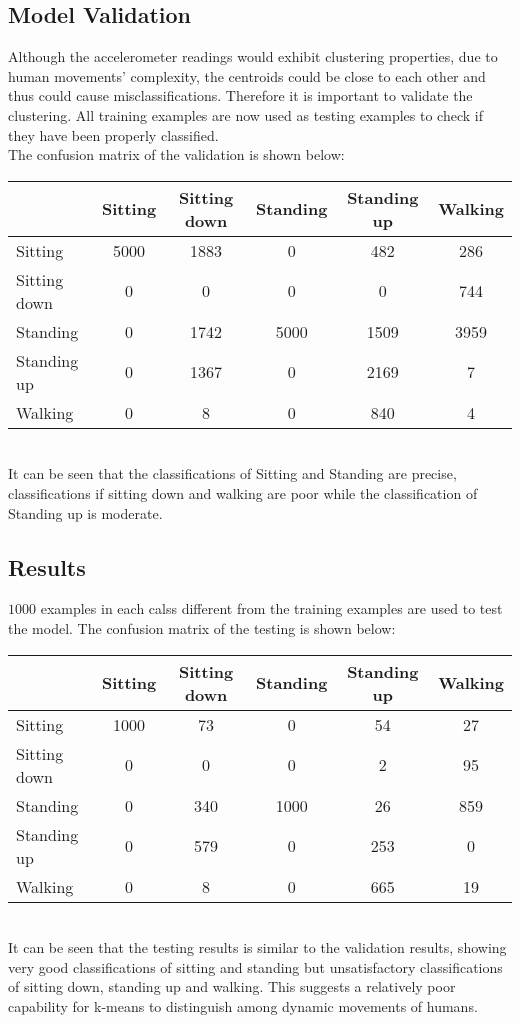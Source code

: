 \documentclass[a4paper, 11pt]{article}
\begin{document}
\subsection{Model Validation}
Although the accelerometer readings would exhibit clustering properties, due to human movements' complexity, the centroids could be close to each other and thus could cause misclassifications. Therefore it is important to validate the clustering. All training examples are now used as testing examples to check if they have been properly classified.\\
The confusion matrix of the validation is shown below: \\
\begin{table}[!h]
  \renewcommand{\arraystretch}{1.5}
  \begin{tabular}[<+position+>]{l|c|c|c|c|c}
    & Sitting & Sitting down & Standing & Standing up & Walking \\ \hline
    Sitting & 5000 & 1883 & 0 & 482 & 286 \\
    Sitting down & 0 & 0 & 0 & 0 & 744 \\
    Standing & 0 & 1742 & 5000 & 1509 & 3959 \\
    Standing up & 0 & 1367 & 0 & 2169 & 7 \\
    Walking & 0 & 8 & 0 & 840 & 4
  \end{tabular}
\end{table} \\
It can be seen that the classifications of Sitting and Standing are precise, classifications if sitting down and walking are poor while the classification of Standing up is moderate. 

\subsection{Results}
$1000$ examples in each calss different from the training examples are used to test the model. The confusion matrix of the testing is shown below: \\
\begin{table}[!h]
  \renewcommand{\arraystretch}{1.5}
  \begin{tabular}[<+position+>]{l|c|c|c|c|c}
    & Sitting & Sitting down & Standing & Standing up & Walking \\ \hline
    Sitting & 1000 & 73 & 0 & 54 & 27 \\
    Sitting down & 0 & 0 & 0 & 2 & 95 \\
    Standing & 0 & 340 & 1000 & 26 & 859 \\
    Standing up & 0 & 579 & 0 & 253 & 0 \\
    Walking & 0 & 8 & 0 & 665 & 19
  \end{tabular}
\end{table} \\
It can be seen that the testing results is similar to the validation results, showing very good classifications of sitting and standing but unsatisfactory classifications of sitting down, standing up and walking. This suggests a relatively poor capability for k-means to distinguish among dynamic movements of humans.
\end{document}
